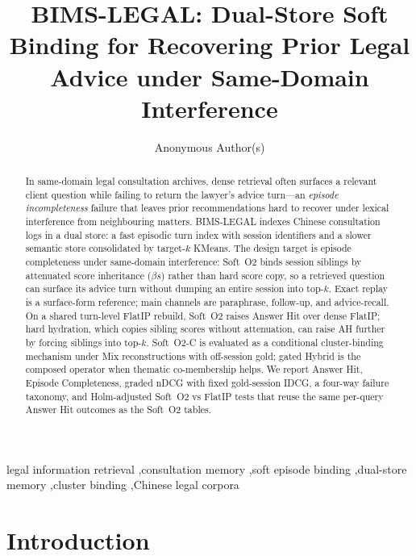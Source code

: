 \documentclass[preprint,12pt,authoryear]{elsarticle}
\begin{document}
\begin{frontmatter}

\title{BIMS-LEGAL: Dual-Store Soft Binding for Recovering Prior Legal Advice under Same-Domain Interference}

\author[]{Anonymous Author(s)}

\begin{abstract}
\sloppy
In same-domain legal consultation archives, dense retrieval often surfaces a relevant client question while failing to return the lawyer's advice turn---an \emph{episode incompleteness} failure that leaves prior recommendations hard to recover under lexical interference from neighbouring matters.
BIMS-LEGAL indexes Chinese consultation logs in a dual store: a fast episodic turn index with session identifiers and a slower semantic store consolidated by target-$k$ KMeans.
The design target is episode completeness under same-domain interference: Soft~O2 binds session siblings by attenuated score inheritance ($\beta s$) rather than hard score copy, so a retrieved question can surface its advice turn without dumping an entire session into top-$k$.
Exact replay is a surface-form reference; main channels are paraphrase, follow-up, and advice-recall.
On a shared turn-level FlatIP rebuild, Soft~O2 raises Answer Hit over dense FlatIP; hard hydration, which copies sibling scores without attenuation, can raise AH further by forcing siblings into top-$k$.
Soft~O2-C is evaluated as a conditional cluster-binding mechanism under Mix reconstructions with off-session gold; gated Hybrid is the composed operator when thematic co-membership helps.
We report Answer Hit, Episode Completeness, graded nDCG with fixed gold-session IDCG, a four-way failure taxonomy, and Holm-adjusted Soft~O2 vs FlatIP tests that reuse the same per-query Answer Hit outcomes as the Soft~O2 tables.
\end{abstract}

\begin{keyword}
legal information retrieval \sep consultation memory \sep soft episode binding \sep dual-store memory \sep cluster binding \sep Chinese legal corpora
\end{keyword}

\end{frontmatter}

\linenumbers

\section{Introduction}\label{sec:intro}
\end{document}
